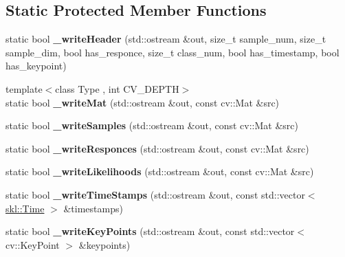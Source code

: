 \subsection*{Static Protected Member Functions}
\begin{DoxyCompactItemize}
\item 
\hypertarget{classskl_1_1_sample_set_writer_a8277a3d1956397b1ee82086bf34815ef}{}\label{classskl_1_1_sample_set_writer_a8277a3d1956397b1ee82086bf34815ef} 
static bool {\bfseries \+\_\+write\+Header} (std\+::ostream \&out, size\+\_\+t sample\+\_\+num, size\+\_\+t sample\+\_\+dim, bool has\+\_\+responce, size\+\_\+t class\+\_\+num, bool has\+\_\+timestamp, bool has\+\_\+keypoint)
\item 
\hypertarget{classskl_1_1_sample_set_writer_ac279b2ff8782f4d03b72423a4dcaaf21}{}\label{classskl_1_1_sample_set_writer_ac279b2ff8782f4d03b72423a4dcaaf21} 
{\footnotesize template$<$class Type , int C\+V\+\_\+\+D\+E\+P\+TH$>$ }\\static bool {\bfseries \+\_\+write\+Mat} (std\+::ostream \&out, const cv\+::\+Mat \&src)
\item 
\hypertarget{classskl_1_1_sample_set_writer_aef535ade4a6aed80a33f73717e134cfc}{}\label{classskl_1_1_sample_set_writer_aef535ade4a6aed80a33f73717e134cfc} 
static bool {\bfseries \+\_\+write\+Samples} (std\+::ostream \&out, const cv\+::\+Mat \&src)
\item 
\hypertarget{classskl_1_1_sample_set_writer_a0b0dea9b5c5e1eef872df19c33f5e048}{}\label{classskl_1_1_sample_set_writer_a0b0dea9b5c5e1eef872df19c33f5e048} 
static bool {\bfseries \+\_\+write\+Responces} (std\+::ostream \&out, const cv\+::\+Mat \&src)
\item 
\hypertarget{classskl_1_1_sample_set_writer_aff2bb56a9d1c3b990e0a0f2ee5681054}{}\label{classskl_1_1_sample_set_writer_aff2bb56a9d1c3b990e0a0f2ee5681054} 
static bool {\bfseries \+\_\+write\+Likelihoods} (std\+::ostream \&out, const cv\+::\+Mat \&src)
\item 
\hypertarget{classskl_1_1_sample_set_writer_a4ea8ae2783f27bed14a784df5d67d2de}{}\label{classskl_1_1_sample_set_writer_a4ea8ae2783f27bed14a784df5d67d2de} 
static bool {\bfseries \+\_\+write\+Time\+Stamps} (std\+::ostream \&out, const std\+::vector$<$ \hyperlink{classskl_1_1_time}{skl\+::\+Time} $>$ \&timestamps)
\item 
\hypertarget{classskl_1_1_sample_set_writer_ab34808ffb01f4dd084e3fba03a4aba7a}{}\label{classskl_1_1_sample_set_writer_ab34808ffb01f4dd084e3fba03a4aba7a} 
static bool {\bfseries \+\_\+write\+Key\+Points} (std\+::ostream \&out, const std\+::vector$<$ cv\+::\+Key\+Point $>$ \&keypoints)
\end{DoxyCompactItemize}


